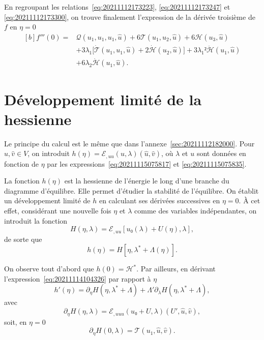 \documentclass[12pt, final]{amsart}
\begin{document}
En regroupant les relations~\eqref{eq:20211112173223},
\eqref{eq:20211112173247} et \eqref{eq:20211112173300}, on trouve finalement
l'expression de la dérivée troisième de \(f\) en \(η=0\)
\begin{equation}
\label{eq:20211112182402}
  \begin{aligned}[b]
    f'''(0)={}&\mathcal Q(u_1, u_1, u_1, \hat{u})
    +6\mathcal T(u_1, u_2, \hat{u})+6\mathcal H(u_3, \hat{u})\\
    &+3\lambda_1\bigl[\dot{\mathcal T}(u_1, u_1, \hat{u})
    +2\dot{\mathcal H}(u_2, \hat{u})\bigr]
    +3\lambda_1²\ddot{\mathcal H}(u_1, \hat{u})\\
    &+6\lambda_2\dot{\mathcal H}(u_1, \hat{u}).
  \end{aligned}
\end{equation}

\section{Développement limité de la hessienne}
\label{sec:20211115081016}

Le principe du calcul est le même que dans
l'annexe~\ref{sec:20211112182000}. Pour \(\hat{u}, \hat{v}∈ V\), on introduit
\(h(η)=ℰ_{,uu}(u, \lambda)(\hat{u}, \hat{v})\), où \(\lambda\) et
\(u\) sont données en fonction de \(η\) par les
expressions~\eqref{eq:20211115075817} et \eqref{eq:20211115075835}.

La fonction \(h(η)\) est la hessienne de l'énergie le long d'une branche du
diagramme d'équilibre. Elle permet d'étudier la stabilité de l'équilibre. On
établit un développement limité de \(h\) en calculant ses dérivées successives
en \(η=0\). \`A cet effet, considérant une nouvelle fois \(η\) et
\(\lambda\) comme des variables indépendantes, on introduit la fonction
\begin{equation}
  H(η, \lambda)=ℰ_{,uu}[u₀(\lambda)+U(η), \lambda],
\end{equation}
de sorte que
\begin{equation}
  \label{eq:20211114104326}
  h(η)=H[η, \lambda^\ast+\Lambda(η)].
\end{equation}

On observe tout d'abord que \(h(0)=\mathcal H^\ast\). Par ailleurs, en dérivant
l'expression~\eqref{eq:20211114104326} par rapport à \(η\)
\begin{equation}
  \label{eq:20211114110210}
  h'(η)=\partial_η H(η, \lambda^\ast+\Lambda)
  +\Lambda'\partial_\lambda H(η, \lambda^\ast+\Lambda),
\end{equation}
avec
\begin{equation}
  \label{eq:20211114110852}
  \partial_η H(η, \lambda)=ℰ_{,uuu}(u₀+U, \lambda)(U', \hat{u}, \hat{v}),
\end{equation}
soit, en \(η=0\)
\begin{equation}
  \label{eq:20211114110230}
  \partial_η H(0, \lambda)=\mathcal T(u_1, \hat{u}, \hat{v}).
\end{equation}
\end{document}
